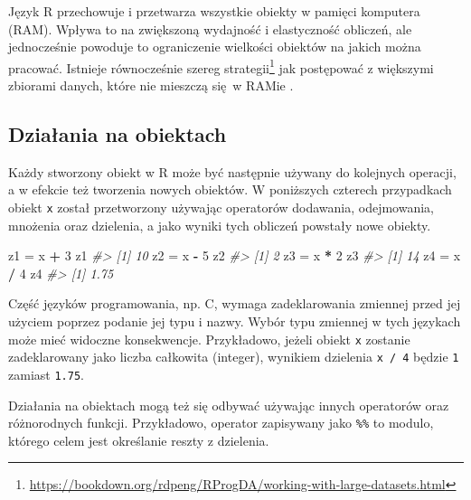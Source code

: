 \documentclass[paper=6in:9in,pagesize=pdftex,headinclude=on,footinclude=on,10pt]{scrbook}
\newenvironment{Shaded}{\begin{snugshade}}{\end{snugshade}}
\newcommand{\CommentTok}[1]{\textcolor[rgb]{0.56,0.35,0.01}{\textit{#1}}}
\newcommand{\DecValTok}[1]{\textcolor[rgb]{0.00,0.00,0.81}{#1}}
\newcommand{\NormalTok}[1]{#1}
\newcommand{\OperatorTok}[1]{\textcolor[rgb]{0.81,0.36,0.00}{\textbf{#1}}}
\newcommand{\StringTok}[1]{\textcolor[rgb]{0.31,0.60,0.02}{#1}}
\DeclareRobustCommand{\href}[2]{#2\footnote{\url{#1}}}
\let\BeginKnitrBlock\begin \let\EndKnitrBlock\end
\begin{document}
Język R przechowuje i przetwarza wszystkie obiekty w pamięci komputera (RAM).
Wpływa to na zwiększoną wydajność i elastyczność obliczeń, ale jednocześnie powoduje to ograniczenie wielkości obiektów na jakich można pracować.
Istnieje równocześnie \href{https://bookdown.org/rdpeng/RProgDA/working-with-large-datasets.html}{szereg strategii} jak postępować z większymi zbiorami danych, które nie mieszczą się~w RAMie \citep{pengMasteringSoftwareDevelopment2017}.

\hypertarget{dzialania-na-obiektach}{%
\subsection{Działania na obiektach}\label{dzialania-na-obiektach}}

Każdy stworzony obiekt w R może być następnie używany do kolejnych operacji, a w efekcie też tworzenia nowych obiektów.
W poniższych czterech przypadkach obiekt \texttt{x} został przetworzony używając operatorów dodawania, odejmowania, mnożenia oraz dzielenia, a jako wyniki tych obliczeń powstały nowe obiekty.

\begin{Shaded}
\begin{Highlighting}[]
\NormalTok{z1 =}\StringTok{ }\NormalTok{x }\OperatorTok{+}\StringTok{ }\DecValTok{3}
\NormalTok{z1}
\CommentTok{#> [1] 10}
\NormalTok{z2 =}\StringTok{ }\NormalTok{x }\OperatorTok{-}\StringTok{ }\DecValTok{5}
\NormalTok{z2}
\CommentTok{#> [1] 2}
\NormalTok{z3 =}\StringTok{ }\NormalTok{x }\OperatorTok{*}\StringTok{ }\DecValTok{2}
\NormalTok{z3}
\CommentTok{#> [1] 14}
\NormalTok{z4 =}\StringTok{ }\NormalTok{x }\OperatorTok{/}\StringTok{ }\DecValTok{4}
\NormalTok{z4}
\CommentTok{#> [1] 1.75}
\end{Highlighting}
\end{Shaded}

\BeginKnitrBlock{rmdinfo}
Część języków programowania, np. C, wymaga zadeklarowania zmiennej przed jej użyciem poprzez podanie jej typu i nazwy.
Wybór typu zmiennej w tych językach może mieć widoczne konsekwencje.
Przykładowo, jeżeli obiekt \texttt{x} zostanie zadeklarowany jako liczba całkowita (integer), wynikiem dzielenia \texttt{x\ /\ 4} będzie \texttt{1} zamiast \texttt{1.75}.
\EndKnitrBlock{rmdinfo}

Działania na obiektach mogą też się odbywać używając innych operatorów oraz różnorodnych funkcji.
Przykładowo, operator zapisywany jako \texttt{\%\%} to modulo, którego celem jest określanie reszty z dzielenia.
\end{document}
